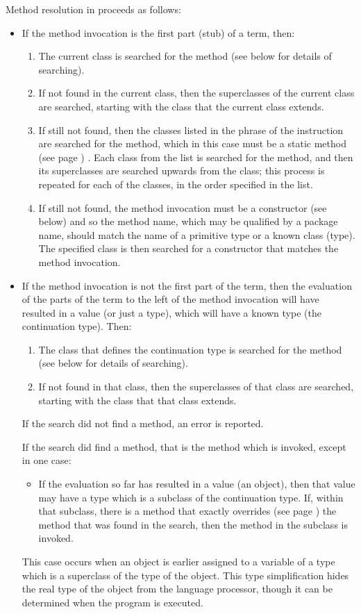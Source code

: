 Method resolution in \nr{} proceeds as follows:
\begin{itemize}
\item 
If the method invocation is the first part (stub) of a term, then:
\begin{enumerate}
\item 
The current class is searched for the method (see below for details of
searching).
\item If not found in the current class, then the superclasses of the
current class are searched, starting with the class that the current
class extends.
\item 
If still not found, then the classes listed in the  phrase
of the  instruction are searched for the method, which in
this case must be a  static method (see page \pageref{refstatmet}) .
Each class from the list is searched for the method, and then its
superclasses are searched upwards from the class; this process is
repeated for each of the classes, in the order specified in the list.
\item 
If still not found, the method invocation must be a constructor (see
below) and so the method name, which may be qualified by a package name,
should match the name of a primitive type or a known class (type).
The specified class is then searched for a constructor that matches the
method invocation.
\end{enumerate}
\item 
If the method invocation is not the first part of the term, then the
evaluation of the parts of the term to the left of the method invocation
will have resulted in a value (or just a type), which will have a known
type (the continuation type).
Then:
\begin{enumerate}
\item 
The class that defines the continuation type is searched for the method
(see below for details of searching).
\item If not found in that class, then the superclasses of that class are
searched, starting with the class that that class extends.
\end{enumerate}
 If the search did not find a method, an error is reported.
 
If the search did find a method, that is the method which is invoked,
except in one case:
\begin{itemize}
\item If the evaluation so far has resulted in a value (an object), then
that value may have a type which is a subclass of the continuation type.
If, within that subclass, there is a method that
 exactly overrides (see page \pageref{refoverrid})  the method that was found in the
search, then the method in the subclass is invoked.
\end{itemize}

This case occurs when an object is earlier assigned to a variable of a
type which is a superclass of the type of the object.  This type
simplification hides the real type of the object from the language
processor, though it can be determined when the program is executed.
\end{itemize}
 
